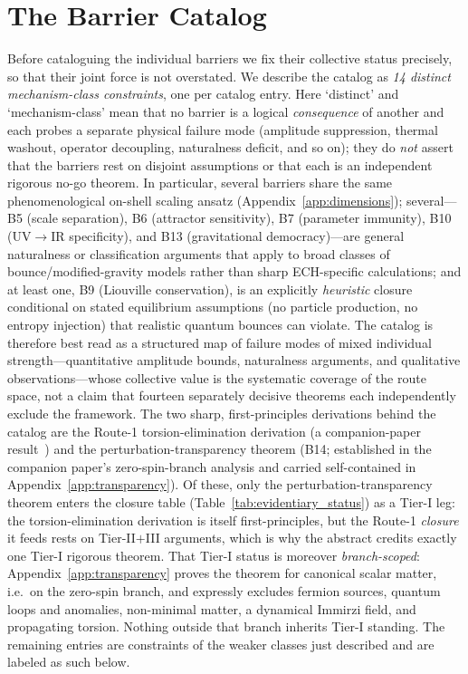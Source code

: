 \documentclass[aps,prd,twocolumn,superscriptaddress,showpacs,preprintnumbers,nofootinbib,longbibliography,floatfix]{revtex4-2}
\begin{document}
\section{The Barrier Catalog}\label{sec:barriers}

Before cataloguing the individual barriers we fix their collective status
precisely, so that their joint force is not overstated. We describe the
catalog as \emph{14 distinct mechanism-class constraints}, one per
catalog entry. Here `distinct' and `mechanism-class'
mean that no barrier is a logical \emph{consequence} of another and each
probes a separate physical failure mode (amplitude suppression, thermal
washout, operator decoupling, naturalness deficit, and so on); they do
\emph{not} assert that the barriers rest on disjoint assumptions or that
each is an independent rigorous no-go theorem. In particular, several
barriers share the same phenomenological on-shell scaling ansatz
(Appendix~\ref{app:dimensions}); several---B5 (scale separation), B6
(attractor sensitivity), B7 (parameter immunity), B10 (UV$\to$IR
specificity), and B13 (gravitational democracy)---are general naturalness
or classification arguments that apply to broad classes of
bounce/modified-gravity models rather than sharp ECH-specific
calculations; and at least one, B9 (Liouville conservation), is an
explicitly \emph{heuristic} closure conditional on stated equilibrium
assumptions (no particle production, no entropy injection) that realistic
quantum bounces can violate. The catalog is therefore best read as a
structured map of failure modes of mixed individual
strength---quantitative amplitude bounds, naturalness arguments, and
qualitative observations---whose collective value is the systematic
coverage of the route space, not a claim that fourteen separately decisive
theorems each independently exclude the framework. The two sharp,
first-principles derivations behind the catalog are the Route-1
torsion-elimination derivation (a companion-paper
result~\cite{Golden2026P1a}) and the perturbation-transparency theorem
(B14; established in the companion paper's zero-spin-branch analysis and
carried self-contained in Appendix~\ref{app:transparency}). Of these,
only the perturbation-transparency theorem enters the closure table
(Table~\ref{tab:evidentiary_status}) as a Tier-I leg: the
torsion-elimination derivation is itself first-principles, but the
Route-1 \emph{closure} it feeds rests on Tier-II$+$III arguments, which
is why the abstract credits exactly one Tier-I rigorous theorem. That
Tier-I status is moreover \emph{branch-scoped}: Appendix~\ref{app:transparency}
proves the theorem for canonical scalar matter, i.e.\ on the zero-spin
branch, and expressly excludes fermion sources, quantum loops and
anomalies, non-minimal matter, a dynamical Immirzi field, and propagating
torsion. Nothing outside that branch inherits Tier-I standing. The
remaining entries are constraints of the weaker classes just described
and are labeled as such below.
\end{document}
